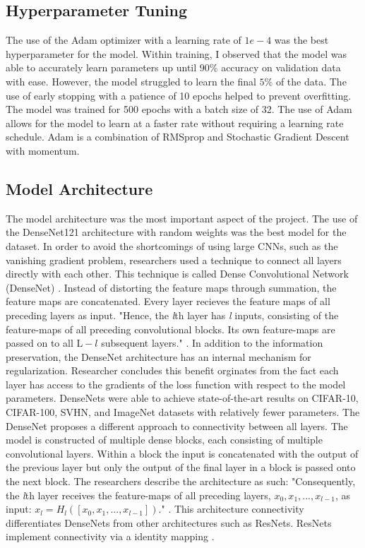 \documentclass[conference]{IEEEtran}
\begin{document}
\subsection{Hyperparameter Tuning}
The use of the Adam optimizer with a learning rate of $1e-4$ was the best hyperparameter for the model. Within training, I observed that the model was able to accurately learn parameters up until $90\%$ accuracy on validation data with ease. However, the model struggled to learn the final $5\%$ of the data. The use of early stopping with a patience of 10 epochs helped to prevent overfitting. The model was trained for 500 epochs with a batch size of 32. The use of Adam allows for the model to learn at a faster rate without requiring a learning rate schedule. Adam is a combination of RMSprop and Stochastic Gradient Descent with momentum. 

\subsection{Model Architecture}
The model architecture was the most important aspect of the project. The use of the DenseNet121 architecture with random weights was the best model for the dataset. In order to avoid the shortcomings of using large CNNs, such as the vanishing gradient problem, researchers used a technique to connect all layers directly with each other. This technique is called Dense Convolutional Network (DenseNet) \cite{DBLP:journals/corr/HuangLW16a}. Instead of distorting the feature maps through summation, the feature maps are concatenated. Every layer recieves the feature maps of all preceding layers as input. "Hence, the \textit{l}th layer has \textit{l} inputs, consisting of the feature-maps of all preceding convolutional blocks. Its own feature-maps are passed on to all $\text{L}-l$ subsequent layers." \cite{DBLP:journals/corr/HuangLW16a}. In addition to the information preservation, the DenseNet architecture has an internal mechanism for regularization. Researcher concludes this benefit orginates from the fact each layer has access to the gradients of the loss function with respect to the model parameters. DenseNets were able to achieve state-of-the-art results on CIFAR-10, CIFAR-100, SVHN, and ImageNet datasets with relatively fewer parameters. The DenseNet proposes a different approach to connectivity between all layers. The model is constructed of multiple dense blocks, each consisting of multiple convolutional layers. Within a block the input is concatenated with the output of the previous layer but only the output of the final layer in a block is passed onto the next block. The researchers describe the architecture as such: "Consequently, the \textit{l}th layer receives the feature-maps of all preceding layers, $x_0, x_1, . . . , x_{l-1}$, as input: $x_l = H_l([x_0, x_1, . . . , x_{l-1}])$." \cite{DBLP:journals/corr/HuangLW16a}. This architecture connectivity differentiates DenseNets from other architectures such as ResNets. ResNets implement connectivity via a identity mapping \cite{DBLP:journals/corr/HeZRS15}.
\end{document}
